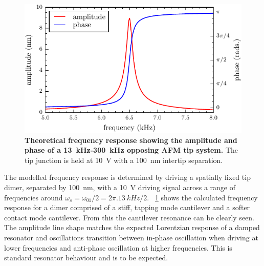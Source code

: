 \documentclass{article}
\begin{document}
\begin{figure}[bt]
\centering
\includegraphics{figures/afm_theory_frequency_response}
\caption[Theoretical frequency response showing the amplitude and phase of a \SI{13}{kHz}-\SI{300}{kHz} opposing AFM tip system]{\textbf{Theoretical frequency response showing the amplitude and phase of a \SI{13}{kHz}-\SI{300}{kHz} opposing AFM tip system.} The tip junction is held at \SI{10}{V} with a \SI{100}{nm} intertip separation.}
\label{fig:num_freq_resp}
\end{figure}

The modelled frequency response is determined by driving a spatially fixed tip dimer, separated by \SI{100}{nm}, with a \SI{10}{V} driving signal across a range of frequencies around $\omega_s = \omega_{01}/2 = 2\pi.\SI{13}{kHz}/2$. \figurename~\ref{fig:num_freq_resp} shows the calculated frequency response for a dimer comprised of a stiff, tapping mode cantilever and a softer contact mode cantilever. From this the cantilever resonance can be clearly seen. The amplitude line shape matches the expected Lorentzian response of a damped resonator and oscillations transition between in-phase oscillation when driving at lower frequencies and anti-phase oscillation at higher frequencies. This is standard resonator behaviour and is to be expected.
\end{document}

